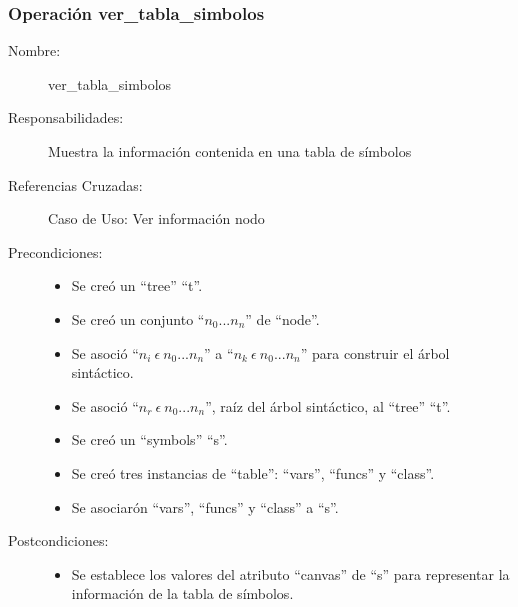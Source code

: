 \subsubsection{Operación ver\_tabla\_simbolos}
\FloatBarrier
\begin{framed}
	\begin{description}
		\item [Nombre:] ver\_tabla\_simbolos
		\item [Responsabilidades:] Muestra la información contenida en una tabla de símbolos
		\item [Referencias Cruzadas: ] Caso de Uso: Ver información nodo
      \item [Precondiciones:] \hfill
         \begin {itemize}
         \item Se creó un ``tree'' ``t''.
         \item Se creó un conjunto ``$n_0...n_n$'' de ``node''.
         \item Se asoció ``$n_i\ \epsilon\ n_0...n_n$'' a ``$n_k\ \epsilon\ n_0...n_n$'' para construir el árbol sintáctico.
         \item Se asoció  ``$n_r\ \epsilon\ n_0...n_n$'', raíz del árbol sintáctico, al ``tree'' ``t''.
         \item Se creó un ``symbols'' ``s''.
         \item Se creó tres instancias de ``table'': ``vars'', ``funcs'' y ``class''.
         \item Se asociarón ``vars'', ``funcs'' y ``class'' a ``s''.
      \end{itemize}
      \item [Postcondiciones:] \hfill
      \begin {itemize}
         \item Se establece los valores del atributo ``canvas'' de ``s'' para representar la información de la tabla de símbolos.
      \end{itemize}
	\end{description} 
\end{framed}
\FloatBarrier



